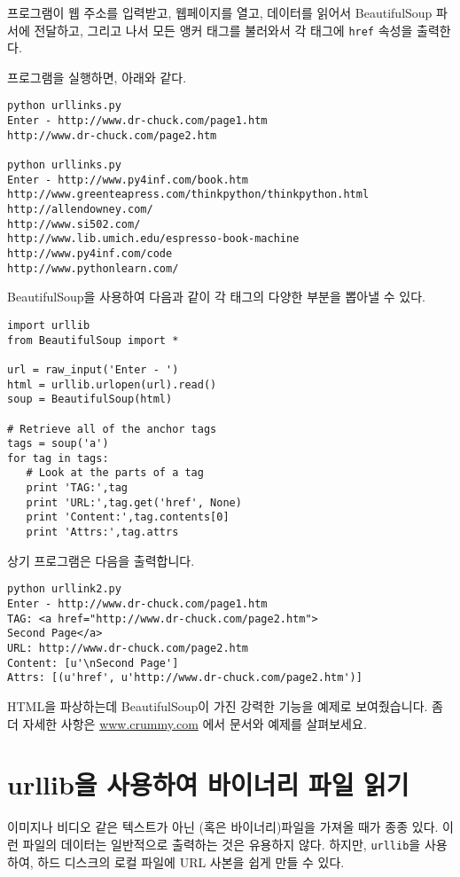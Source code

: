 프로그램이 웹 주소를 입력받고, 웹페이지를 열고, 데이터를 읽어서 BeautifulSoup 파서에 전달하고,
그리고 나서 모든 앵커 태그를 불러와서 각 태그에 {\tt href} 속성을 출력한다.

프로그램을 실행하면, 아래와 같다.

\beforeverb
\begin{verbatim}
python urllinks.py 
Enter - http://www.dr-chuck.com/page1.htm
http://www.dr-chuck.com/page2.htm

python urllinks.py 
Enter - http://www.py4inf.com/book.htm
http://www.greenteapress.com/thinkpython/thinkpython.html
http://allendowney.com/
http://www.si502.com/
http://www.lib.umich.edu/espresso-book-machine
http://www.py4inf.com/code
http://www.pythonlearn.com/
\end{verbatim}
\afterverb
%

BeautifulSoup을 사용하여 다음과 같이 각 태그의 다양한 부분을 뽑아낼 수 있다.

\beforeverb
\begin{verbatim}
import urllib
from BeautifulSoup import *

url = raw_input('Enter - ')
html = urllib.urlopen(url).read()
soup = BeautifulSoup(html)

# Retrieve all of the anchor tags
tags = soup('a')
for tag in tags:
   # Look at the parts of a tag
   print 'TAG:',tag
   print 'URL:',tag.get('href', None)
   print 'Content:',tag.contents[0]
   print 'Attrs:',tag.attrs
\end{verbatim}
\afterverb
%

상기 프로그램은 다음을 출력합니다.

\beforeverb
\begin{verbatim}
python urllink2.py 
Enter - http://www.dr-chuck.com/page1.htm
TAG: <a href="http://www.dr-chuck.com/page2.htm">
Second Page</a>
URL: http://www.dr-chuck.com/page2.htm
Content: [u'\nSecond Page']
Attrs: [(u'href', u'http://www.dr-chuck.com/page2.htm')]
\end{verbatim}
\afterverb
%

HTML을 파상하는데 BeautifulSoup이 가진 강력한 기능을 예제로 보여줬습니다.
좀더 자세한 사항은 \url{www.crummy.com} 에서 문서와 예제를 살펴보세요.

\section{urllib을 사용하여 바이너리 파일 읽기}

이미지나 비디오 같은 텍스트가 아닌 (혹은 바이너리)파일을 가져올 때가 종종 있다.
이런 파일의 데이터는 일반적으로 출력하는 것은 유용하지 않다. 하지만, {\tt urllib}을 사용하여,
하드 디스크의 로컬 파일에 URL 사본을 쉽게 만들 수 있다.

